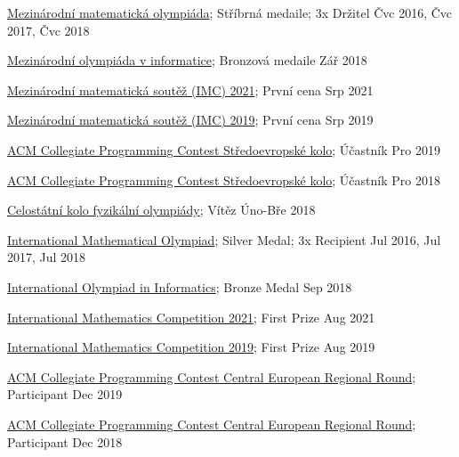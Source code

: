 \ifczech

\href{http://imo-official.org/participant_r.aspx?id=26455}{Mezinárodní matematická olympiáda}; \quad Stříbrná medaile; \quad 3x Držitel \hfill Čvc 2016, Čvc 2017, Čvc 2018 \par
\href{https://stats.ioinformatics.org/people/6494}{Mezinárodní olympiáda v informatice}; \quad Bronzová medaile \hfill Zář 2018\par
\href{https://www.imc-math.org.uk/?act=results&by=sum&year=2021}{Mezinárodní matematická soutěž (IMC) 2021}; \quad První cena \hfill Srp 2021\par
\href{https://www.imc-math.org.uk/?year=2019&section=results&item=bysum}{Mezinárodní matematická soutěž (IMC) 2019}; \quad První cena \hfill Srp 2019\par
\href{https://contest.felk.cvut.cz/19cerc/rank.html}{ACM Collegiate Programming Contest Středoevropské kolo}; \quad Účastník \hfill Pro 2019\par
\href{https://contest.felk.cvut.cz/18cerc/rank.html}{ACM Collegiate Programming Contest Středoevropské kolo}; \quad Účastník \hfill Pro 2018\par
\href{http://fyzikalniolympiada.cz/archiv/celostatni-kola/59}{Celostátní kolo fyzikální olympiády}; \quad Vítěz \hfill Úno-Bře 2018

\else

\href{http://imo-official.org/participant_r.aspx?id=26455}{International Mathematical Olympiad}; \quad Silver Medal; \quad 3x Recipient \hfill Jul 2016, Jul 2017, Jul 2018 \par
\href{https://stats.ioinformatics.org/people/6494}{International Olympiad in Informatics}; \quad Bronze Medal \hfill Sep 2018\par
\href{https://www.imc-math.org.uk/?act=results&by=sum&year=2021}{International Mathematics Competition 2021}; \quad First Prize \hfill Aug 2021\par
\href{https://www.imc-math.org.uk/?year=2019&section=results&item=bysum}{International Mathematics Competition 2019}; \quad First Prize \hfill Aug 2019\par
\href{https://contest.felk.cvut.cz/19cerc/rank.html}{ACM Collegiate Programming Contest Central European Regional Round}; \quad Participant \hfill Dec 2019\par
\href{https://contest.felk.cvut.cz/18cerc/rank.html}{ACM Collegiate Programming Contest Central European Regional Round}; \quad Participant \hfill Dec 2018\par

\fi